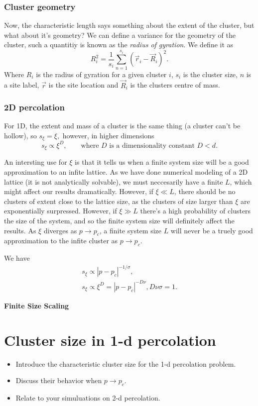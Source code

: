 \documentclass[a4paper, 11pt, notitlepage, english]{article}
\begin{document}
\subsubsection*{Cluster geometry}

Now, the characteristic length says something about the extent of the cluster, but what about it's geometry? We can define a variance for the geometry of the cluster, such a quantitiy is known as the \emph{radius of gyration}. We define it as
$$R_i^2 = \frac{1}{s_i}\sum_{n=1}^{s_i} (\vec{r}_i - \vec{R}_i)^2.$$
Where $R_i$ is the radius of gyration for a given cluster $i$, $s_i$ is the cluster size, $n$ is a site label, $\vec{r}$ is the site location and $\vec{R}_i$ is the clusters centre of mass.

\subsubsection*{2D percolation}
For 1D, the extent and mass of a cluster is the same thing (a cluster can't be hollow), so 
$s_\xi = \xi,$
however, in higher dimensions
$$s_\xi \propto \xi^D, \qquad \mbox{where } D \mbox{ is a dimensionality constant } D < d.$$


An intersting use for $\xi$ is that it tells us when a finite system size will be a good approximation to an infite lattice. As we have done numerical modeling of a 2D lattice (it is not analytically solvable), we must neccesarily have a finite $L$, which might affect our results dramatically. However, if $\xi \ll L$, there should be no clusters of extent close to the lattice size, as the clusters of size larger than $\xi$ are exponentially surpressed. However, if $\xi \gg L$ there's a high probability of clusters the size of the system, and so the finite system size will definitely affect the results. As $\xi$ diverges as $p\to p_c$, a finite system size $L$ will never be a truely good approximation to the infite cluster as $p \to p_c$. 

We have
\begin{align*}
s_\xi \propto |p-p_c|^{-1/\sigma}, \\
s_\xi \propto \xi^D = |p-p_c|^{-D\nu},
D\nu\sigma = 1.
\end{align*}


\textbf{Finite Size Scaling}



\clearpage

\section{Cluster size in 1-d percolation}
\begin{itemize}
	\item Introduce the characteristic cluster size for the 1-d percolation problem.
	\item Discuss their behavior when $p \to p_c$.
	\item Relate to your simuluations on 2-d percolation.
\end{itemize}
\end{document}
